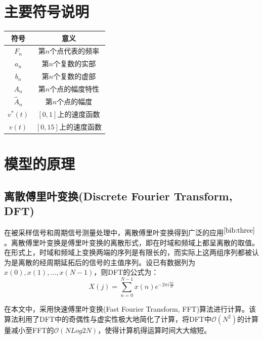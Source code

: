 \documentclass[bwprint]{cumcmthesis}
\begin{document}
    \section{主要符号说明}
        \begin{center}
            \begin{tabular}{cc}
                \hline
                符号	&  意义 \\ \hline
                $F_n$ & 第$n$个点代表的频率 \\ 
                $a_n$ & 第$n$个复数的实部 \\ 
                $b_n$ & 第$n$个复数的虚部 \\ 
                $A_n$ & 第$n$个点的幅度特性 \\ 
                $\widehat{A}_n$ & 第$n$个点的幅度 \\ 
                $v^*(t)$ & $[0,1]$上的速度函数 \\ 
                $v(t)$ & $[0,15]$上的速度函数 \\
                \hline
            \end{tabular}
        \end{center}
    \section{模型的原理}
        \subsection{离散傅里叶变换(Discrete Fourier Transform, DFT)}
        在被采样信号和周期信号测量处理中，离散傅里叶变换得到广泛的应用$^{\cite{bib:three}}$。离散傅里叶变换是傅里叶变换的离散形式，即在时域和频域上都呈离散的取值。在形式上，时域和频域上变换两端的序列是有限长的，而实际上这两组序列都被认为是离散的经周期延拓后的信号的主值序列。设已有数据列为$x(0),x(1),\dots,x(N-1)$，则DFT的公式为：
        \begin{equation}
            \label{eq:DFT}
            X(j) = \sum_{n=0}^{N-1}x(n)e^{-2\pi i\frac{nj}{N}}
        \end{equation}
        
        在本文中，采用快速傅里叶变换(Fast Fourier Transform, FFT)算法进行计算。该算法利用了DFT中的奇偶性与虚实性极大地简化了计算，将DFT中$\mathcal{O}(N^2)$的计算量减小至FFT的$\mathcal{O}(NLog2N)$，使得计算机得运算时间大大缩短。
\end{document}
